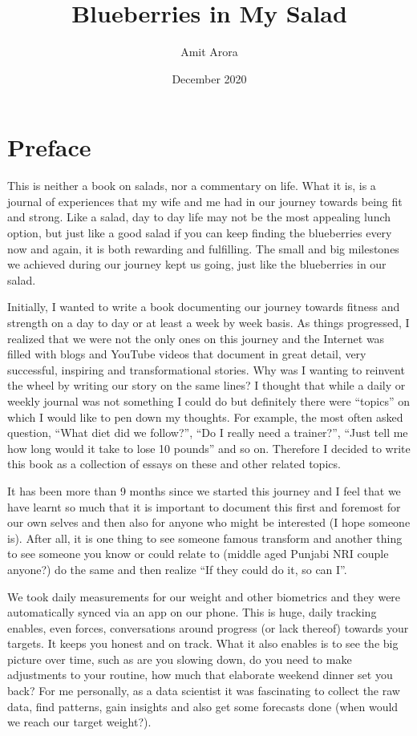 \documentclass[
  oneside]{book}
\title{Blueberries in My Salad}
\author{Amit Arora}
\date{December 2020}
\begin{document}
\maketitle

{
\hypersetup{linkcolor=}
\setcounter{tocdepth}{1}
\tableofcontents
}
\hypertarget{preface}{%
\chapter{Preface}\label{preface}}

This is neither a book on salads, nor a commentary on life. What it is, is a journal of experiences that my wife and me had in our journey towards being fit and strong. Like a salad, day to day life may not be the most appealing lunch option, but just like a good salad if you can keep finding the blueberries every now and again, it is both rewarding and fulfilling. The small and big milestones we achieved during our journey kept us going, just like the blueberries in our salad.

Initially, I wanted to write a book documenting our journey towards fitness and strength on a day to day or at least a week by week basis. As things progressed, I realized that we were not the only ones on this journey and the Internet was filled with blogs and YouTube videos that document in great detail, very successful, inspiring and transformational stories. Why was I wanting to reinvent the wheel by writing our story on the same lines? I thought that while a daily or weekly journal was not something I could do but definitely there were ``topics'' on which I would like to pen down my thoughts. For example, the most often asked question, ``What diet did we follow?'', ``Do I really need a trainer?'', ``Just tell me how long would it take to lose 10 pounds'' and so on. Therefore I decided to write this book as a collection of essays on these and other related topics.

It has been more than 9 months since we started this journey and I feel that we have learnt so much that it is important to document this first and foremost for our own selves and then also for anyone who might be interested (I hope someone is). After all, it is one thing to see someone famous transform and another thing to see someone you know or could relate to (middle aged Punjabi NRI couple anyone?) do the same and then realize ``If they could do it, so can I''.

We took daily measurements for our weight and other biometrics and they were automatically synced via an app on our phone. This is huge, daily tracking enables, even forces, conversations around progress (or lack thereof) towards your targets. It keeps you honest and on track. What it also enables is to see the big picture over time, such as are you slowing down, do you need to make adjustments to your routine, how much that elaborate weekend dinner set you back? For me personally, as a data scientist it was fascinating to collect the raw data, find patterns, gain insights and also get some forecasts done (when would we reach our target weight?).
\end{document}
